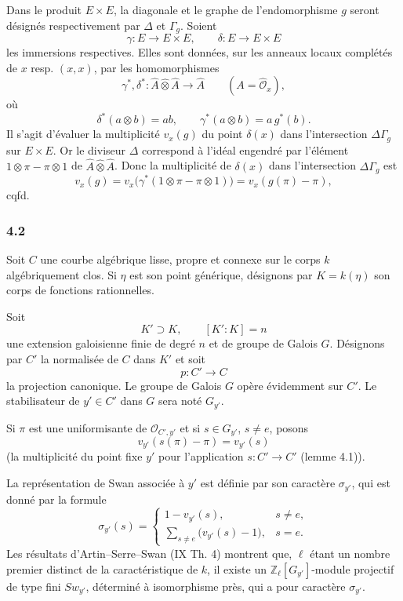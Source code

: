 \documentclass[11pt]{article}
\begin{document}
Dans le produit $E\times E$, la diagonale et le graphe de l'endomorphisme $g$ seront désignés respectivement par $\Delta$ et $\Gamma_g$. Soient
\[
\gamma:E\longrightarrow E\times E,\qquad
\delta:E\longrightarrow E\times E
\]
les immersions respectives. Elles sont données, sur les anneaux locaux complétés de $x$ resp. $(x,x)$, par les homomorphismes
\[
\gamma^*,\delta^*:\widehat A\widehat\otimes\widehat A\longrightarrow \widehat A
\qquad (A=\widehat{\mathcal O}_x),
\]
où
\[
\delta^*(a\otimes b)=ab,\qquad
\gamma^*(a\otimes b)=a\,g^*(b).
\]
Il s'agit d'évaluer la multiplicité $v_x(g)$ du point $\delta(x)$ dans l'intersection $\Delta\Gamma_g$ sur $E\times E$. Or le diviseur $\Delta$ correspond à l'idéal engendré par l'élément $1\otimes\pi-\pi\otimes1$ de $\widehat A\widehat\otimes\widehat A$. Donc la multiplicité de $\delta(x)$ dans l'intersection $\Delta\Gamma_g$ est
\[
v_x(g)=v_x\bigl(\gamma^*(1\otimes\pi-\pi\otimes1)\bigr)
      =v_x(g(\pi)-\pi),
\]
cqfd.

\subsubsection*{4.2}

Soit $C$ une courbe algébrique lisse, propre et connexe sur le corps $k$ algébriquement clos. Si $\eta$ est son point générique, désignons par $K=k(\eta)$ son corps de fonctions rationnelles.

Soit
\[
K'\supset K,\qquad [K':K]=n
\]
une extension galoisienne finie de degré $n$ et de groupe de Galois $G$. Désignons par $C'$ la normalisée de $C$ dans $K'$ et soit
\[
p:C'\longrightarrow C
\]
la projection canonique. Le groupe de Galois $G$ opère évidemment sur $C'$. Le stabilisateur de $y'\in C'$ dans $G$ sera noté $G_{y'}$.

Si $\pi$ est une uniformisante de $\mathcal O_{C',y'}$ et si $s\in G_{y'}$, $s\ne e$, posons
\[
v_{y'}(s(\pi)-\pi)=v_{y'}(s)
\tag{4.2.1}
\]
(la multiplicité du point fixe $y'$ pour l'application $s:C'\to C'$ (lemme 4.1)).

La représentation de Swan associée à $y'$ est définie par son caractère $\sigma_{y'}$, qui est donné par la formule
\[
\sigma_{y'}(s)=
\begin{cases}
1-v_{y'}(s),& s\ne e,\\[0.4em]
\displaystyle\sum_{s\ne e}\bigl(v_{y'}(s)-1\bigr),& s=e.
\end{cases}
\tag{4.2.2}
\]
Les résultats d'Artin--Serre--Swan (IX Th. 4) montrent que, $\ell$ étant un nombre premier distinct de la caractéristique de $k$, il existe un $\mathbb Z_\ell[G_{y'}]$-module projectif de type fini $Sw_{y'}$, déterminé à isomorphisme près, qui a pour caractère $\sigma_{y'}$.
\end{document}
